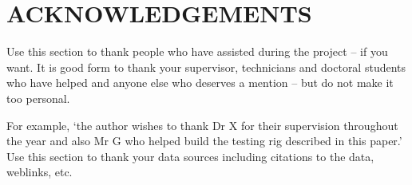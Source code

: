 \section{ACKNOWLEDGEMENTS}
Use this section to thank people who have assisted during the project – if you want. It is good form to thank your supervisor, technicians and doctoral students who have helped and anyone else who deserves a mention – but do not make it too personal. 

For example, ‘the author wishes to thank Dr X for their supervision throughout the year and also Mr G who helped build the testing rig described in this paper.’
Use this section to thank your data sources including citations to the data, weblinks, etc.